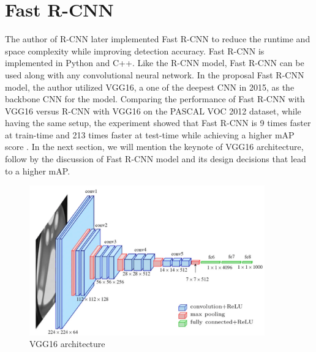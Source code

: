 \section{Fast R-CNN}

The author of R-CNN later implemented Fast R-CNN to reduce the runtime and space complexity while improving detection accuracy. Fast R-CNN is implemented in Python and C++. Like the R-CNN model, Fast R-CNN can be used along with any convolutional neural network. In the proposal Fast R-CNN model, the author utilized VGG16, a one of the deepest CNN in 2015, as the backbone CNN for the model. Comparing the performance of Fast R-CNN with VGG16 versus R-CNN with VGG16 on the PASCAL VOC 2012 dataset, while having the same setup, the experiment showed that Fast R-CNN is 9 times faster at train-time and 213 times faster at test-time while achieving a higher mAP score \cite{fast_rcnn_og}. In the next section, we will mention the keynote of VGG16 architecture, follow by the discussion of Fast R-CNN model and its design decisions that lead to a higher mAP.

\begin{figure}[!ht]
    \centering
    \includegraphics[width=4in]{figures/vgg16_architect.png}
    \caption{VGG16 architecture \cite{vgg16_architect_2014}}
    \label{fig:vgg16_archite}
\end{figure}

